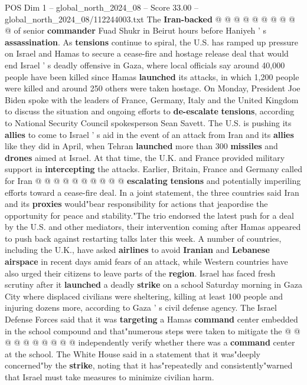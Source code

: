\begin{textsample}{POS Dim 1 – global\_north\_2024\_08 – Score 33.00 – global\_north\_2024\_08/112244003.txt}
The \textbf{Iran-backed} @ @ @ @ @ @ @ @ @ @ of senior \textbf{commander} Fuad Shukr in Beirut hours before Haniyeh ' s \textbf{assassination}.
As \textbf{tensions} continue to spiral, the U.S. has ramped up pressure on Israel and Hamas to secure a cease-fire and hostage release deal that would end Israel ' s deadly offensive in Gaza, where local officials say around 40,000 people have been killed since Hamas \textbf{launched} its attacks, in which 1,200 people were killed and around 250 others were taken hostage.
On Monday, President Joe Biden spoke with the leaders of France, Germany, Italy and the United Kingdom to discuss the situation and ongoing efforts to \textbf{de-escalate} \textbf{tensions}, according to National Security Council spokesperson Sean Savett.
The U.S. is pushing its \textbf{allies} to come to Israel ' s aid in the event of an attack from Iran and its \textbf{allies} like they did in April, when Tehran \textbf{launched} more than 300 \textbf{missiles} and \textbf{drones} aimed at Israel.
At that time, the U.K. and France provided military support in \textbf{intercepting} the attacks.
Earlier, Britain, France and Germany called for Iran @ @ @ @ @ @ @ @ @ @ \textbf{escalating} \textbf{tensions} and potentially imperiling efforts toward a cease-fire deal.
In a joint statement, the three countries said Iran and its \textbf{proxies} would"bear responsibility for actions that jeapordise the opportunity for peace and stability."The trio endorsed the latest push for a deal by the U.S. and other mediators, their intervention coming after Hamas appeared to push back against restarting talks later this week.
A number of countries, including the U.K., have asked \textbf{airlines} to avoid \textbf{Iranian} and \textbf{Lebanese} \textbf{airspace} in recent days amid fears of an attack, while Western countries have also urged their citizens to leave parts of the \textbf{region}.
Israel has faced fresh scrutiny after it \textbf{launched} a deadly \textbf{strike} on a school Saturday morning in Gaza City where displaced civilians were sheltering, killing at least 100 people and injuring dozens more, according to Gaza ' s civil defense agency.
The Israel Defense Forces said that it was \textbf{targeting} a Hamas \textbf{command} center embedded in the school compound and that"numerous steps were taken to mitigate the @ @ @ @ @ @ @ @ @ @ independently verify whether there was a \textbf{command} center at the school.
The White House said in a statement that it was"deeply concerned"by the \textbf{strike}, noting that it has"repeatedly and consistently"warned that Israel must take measures to minimize civilian harm.

\end{textsample}
